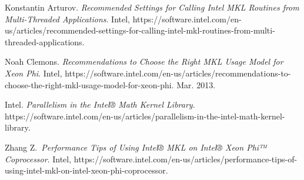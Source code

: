 \documentclass{article}
\begin{document}
{%
\begin{thebibliography}{4}%
\label{sec-bibliography}%

Konstantin Arturov. \emph{Recommended Settings for Calling Intel MKL Routines from Multi-Threaded Applications}. Intel, https://software.intel.com/en-us/articles/recommended-settings-for-calling-intel-mkl-routines-from-multi-threaded-applications.\label{mkl_threads}%

Noah Clemons. \emph{Recommendations to Choose the Right MKL Usage Model for Xeon Phi}. Intel, https://software.intel.com/en-us/articles/recommendations-to-choose-the-right-mkl-usage-model-for-xeon-phi. Mar. 2013.\label{mkl-mic}%

Intel. \emph{Parallelism in the Intel® Math Kernel Library}. https://software.intel.com/en-us/articles/parallelism-in-the-intel-math-kernel-library.\label{paramkl}%

Zhang Z.~\emph{Performance Tips of Using Intel® MKL on Intel® Xeon Phi™ Coprocessor}. Intel, https://software.intel.com/en-us/articles/performance-tips-of-using-intel-mkl-on-intel-xeon-phi-coprocessor.\label{page_file}%
\par%
\end{thebibliography}}%
\end{document}
